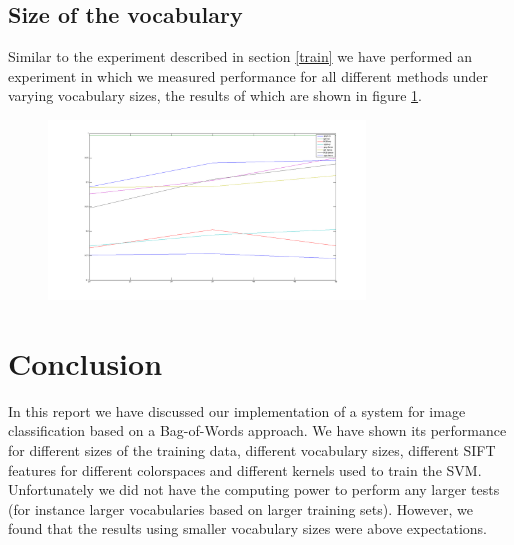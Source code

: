 \documentclass[11pt]{article}
\begin{document}
\subsection{Size of the vocabulary}
Similar to the experiment described in section \ref{train} we have performed an experiment in which we measured performance for all different methods under varying vocabulary sizes, the results of which are shown in figure \ref{vocabularySizes}. 
\begin{figure}[H]
  \centering
    \includegraphics[width=0.75\textwidth]{vocabularySizes}
      \caption{}
      \label{vocabularySizes}
\end{figure}

\section{Conclusion}
In this report we have discussed our implementation of a system for image classification based on a Bag-of-Words approach. We have shown its performance for different sizes of the training data, different vocabulary sizes, different SIFT features for different colorspaces and different kernels used to train the SVM. Unfortunately we did not have the computing power to perform any larger tests (for instance larger vocabularies based on larger training sets). However, we found that the results using smaller vocabulary sizes were above expectations. 
\end{document}
